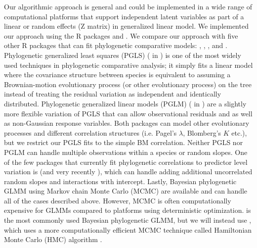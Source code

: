 \documentclass[12pt]{article}
\begin{document}
Our algorithmic approach is general and could be implemented in a wide range of computational platforms that support independent latent variables as part of a linear or random effects (Z matrix) in generalized linear model. 
We implemented our approach using the R packages  \citep{bates2015fitting} and  \citep{brooks2017glmmTMB}.
We compare our approach with five other R packages that can fit phylogenetic comparative models:  \citep{pinheiro2014r},  \citep{ho2014phylolm},  \citep{pearse2015pez}, and  \citep{burkner2016brms}.
Phylogenetic generalized least squares (PGLS) ( in ) is one of the most widely used techniques in phylogenetic comparative analysis; it simply fits a linear model where the covariance structure between species is equivalent to assuming a Brownian-motion evolutionary process (or other evolutionary process) on the tree instead of treating the residual variation as independent and identically distributed. 
Phylogenetic generalized linear models (PGLM) ( in ) are a slightly more flexible variation of PGLS that can allow observational residuals and as well as non-Gaussian response variables.
Both packages can model other evolutionary processes and different correlation structures (i.e. Pagel's $\lambda$, Blomberg's $K$ etc.), but we restrict our PGLS fits to the simple BM correlation. 
Neither PGLS nor PGLM can handle multiple observations within a species or random slopes.
One of the few packages that currently fit phylogenetic correlations to predictor level variation is  (and very recently ), which can handle adding additional uncorrelated random slopes and interactions with intercept.
Lastly, Bayesian phylogenetic GLMM using Markov chain Monte Carlo (MCMC) are available and can handle all of the cases described above. 
However, MCMC is often computationally expensive for GLMMs compared to platforms using deterministic optimization.
 \citep{hadfield2010general} is the most commonly used Bayesian phylogenetic GLMM, but we will instead use , which uses a more computationally efficient MCMC technique called Hamiltonian Monte Carlo (HMC) \citep{duane1987hybrid} algorithm \citep{li2018fitting}.
 
\end{document}
